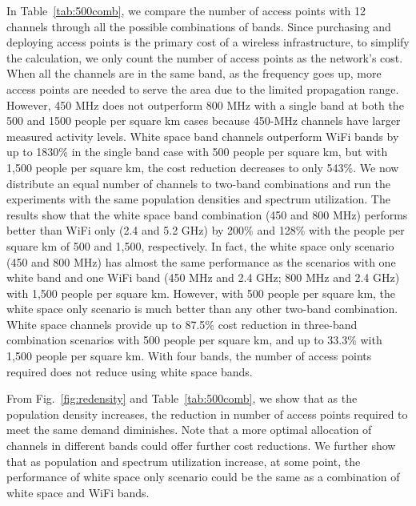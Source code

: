 In Table~\ref{tab:500comb}, we compare the number of access points with 12 channels through all 
the possible combinations of bands. 
Since purchasing and deploying access points is the primary cost of a wireless 
infrastructure, to simplify the calculation, we only count the number of access points as 
the network's cost. 
When all the channels are in the same band, as the frequency goes up, more access 
points are needed to serve the area due to the limited propagation range. However,
450 MHz does not outperform 800 MHz with a single band at both the 500 and 1500 people per
square km cases because 450-MHz channels have larger measured activity levels. 
White space band channels outperform WiFi bands by up to 1830\% in the single band case
with 500 people per square km, but with 1,500 people per square km, the cost reduction
decreases to only 543\%.
We now distribute an equal number of channels to two-band combinations and run the experiments 
with the same population densities and spectrum utilization. The results show that the white space band
combination (450 and 800 MHz) performs better than WiFi only (2.4 and 5.2 GHz) by 200\% and
128\% with the people per square km of 500 and 1,500, respectively. In fact, the white space only
scenario (450 and 800 MHz) has almost the same performance as the scenarios with one white band and
one WiFi band (450 MHz and 2.4 GHz; 800 MHz and 2.4 GHz) with 1,500 people per square km.
However, with 500 people per square km, the white space only scenario is much better than any other two-band combination.
White space channels provide up to 87.5\% cost reduction in three-band combination scenarios with
500 people per square km, and up to 33.3\% with 1,500 people per square km.  With four bands,
the number of access points required does not reduce using white space bands.

From Fig.~\ref{fig:redensity} and Table~\ref{tab:500comb}, we show that as the population
density increases, the reduction in number of access points required to meet the same demand 
diminishes. Note that a more optimal allocation of channels in different bands could offer
further cost reductions. We further show that as population and spectrum utilization increase, 
at some point, the performance of white space only scenario could be the same as a combination of
white space and WiFi bands. 


